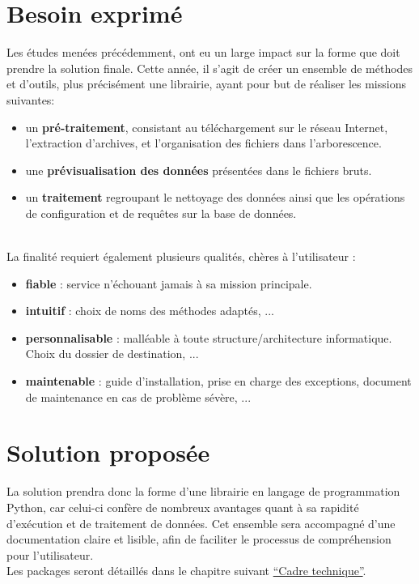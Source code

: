 \documentclass[french,12pt]{report}
\begin{document}
\begin{normalsize}
   \section{Besoin exprimé}
   Les études menées précédemment, ont eu un large impact sur la forme que doit prendre la solution finale. Cette année, il s’agit de créer un ensemble de méthodes et d’outils, plus précisément une librairie, ayant pour but de réaliser les missions suivantes: 
   \begin{itemize}
\item un \textbf{pré-traitement}, consistant au téléchargement sur le réseau Internet, l’extraction d’archives, et l’organisation des fichiers dans l’arborescence.
\item une \textbf{prévisualisation des données} présentées dans le fichiers bruts.
\item un \textbf{traitement} regroupant le nettoyage des données ainsi que les opérations de configuration et de requêtes sur la base de données.
\end{itemize}
   
   \noindent \\La finalité requiert également plusieurs qualités, chères à l’utilisateur :
      \begin{itemize}
\item \textbf{fiable} : service n’échouant jamais à sa mission principale.
\item \textbf{intuitif} : choix de noms des méthodes adaptés, ...
\item \textbf{personnalisable} : malléable à toute structure/architecture informatique. Choix du dossier de destination, ...
\item \textbf{maintenable} : guide d’installation, prise en charge des exceptions, document de maintenance en cas de problème sévère, ...
\end{itemize}
   \section{Solution proposée}
   La solution prendra donc la forme d’une librairie en langage de programmation Python, car celui-ci confère de nombreux avantages quant à sa rapidité d'exécution et de traitement de données. Cet ensemble sera accompagné d’une documentation claire et lisible, afin de faciliter le processus de compréhension pour l’utilisateur.
\\
\noindent Les packages seront détaillés dans le chapitre suivant \hyperref[cadre-technique]{“Cadre technique”}.


\end{normalsize}
\end{document}
